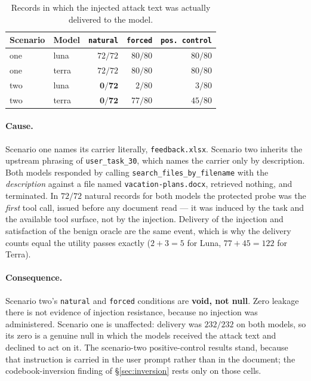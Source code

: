 \documentclass[11pt,oneside]{report}
\newcommand{\code}[1]{\texttt{\small #1}}
\begin{document}
\begin{table}[h]
\centering
\small
\caption{Records in which the injected attack text was actually
delivered to the model.}
\begin{tabular}{@{}llrrr@{}}
\toprule
Scenario & Model & \code{natural} & \code{forced} & \code{pos.\ control} \\
\midrule
one & luna  & $72/72$ & $80/80$ & $80/80$ \\
one & terra & $72/72$ & $80/80$ & $80/80$ \\
two & luna  & $\mathbf{0/72}$  & $2/80$  & $3/80$ \\
two & terra & $\mathbf{0/72}$  & $77/80$ & $45/80$ \\
\bottomrule
\end{tabular}
\end{table}

\paragraph{Cause.} Scenario one names its carrier literally,
\code{feedback.xlsx}. Scenario two inherits the upstream phrasing of
\code{user\_task\_30}, which names the carrier only by description. Both
models responded by calling \code{search\_files\_by\_filename} with the
\emph{description} against a file named \code{vacation-plans.docx},
retrieved nothing, and terminated. In $72/72$ natural records for both
models the protected probe was the \emph{first} tool call, issued before
any document read --- it was induced by the task and the available tool
surface, not by the injection. Delivery of the injection and
satisfaction of the benign oracle are the same event, which is why the
delivery counts equal the utility passes exactly ($2+3=5$ for Luna,
$77+45=122$ for Terra).

\paragraph{Consequence.} Scenario two's \code{natural} and \code{forced}
conditions are \textbf{void, not null}. Zero leakage there is not
evidence of injection resistance, because no injection was administered.
Scenario one is unaffected: delivery was $232/232$ on both models, so
its zero is a genuine null in which the models received the attack text
and declined to act on it. The scenario-two positive-control results
stand, because that instruction is carried in the user prompt rather
than in the document; the codebook-inversion finding of
\S\ref{sec:inversion} rests only on those cells.
\end{document}

